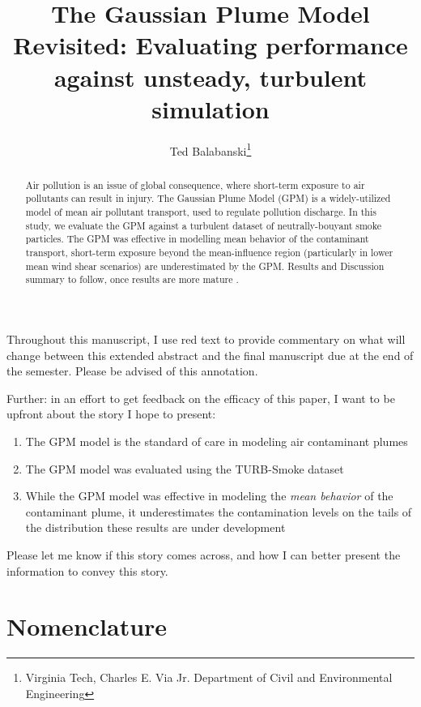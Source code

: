\documentclass[]{aiaa-tc}%
\title{The Gaussian Plume Model Revisited: Evaluating performance against unsteady, turbulent simulation}
\author{ Ted Balabanski\thanks{Virginia Tech, Charles E. Via Jr. Department of Civil and Environmental Engineering} }
\newcommand{\fix}[1]{\color{red} #1 \color{black}}
\begin{document}
\maketitle

\begin{tcolorbox}[colback=blue!4!white,colframe=blue,title=A note to the instructor]
  Throughout this manuscript, I use \fix{red text} to provide commentary on what will change between this extended abstract and the final manuscript due at the end of the semester. Please be advised of this annotation.

  Further: in an effort to get feedback on the efficacy of this paper, I want to be upfront about the story I hope to present:
  \begin{enumerate}
  \item The GPM model is the standard of care in modeling air contaminant plumes
  \item The GPM model was evaluated using the TURB-Smoke dataset
  \item While the GPM model was effective in modeling the \emph{mean behavior} of the contaminant plume, it underestimates the contamination levels on the tails of the distribution \fix{these results are under development}
  \end{enumerate}
  Please let me know if this story comes across, and how I can better present the information to convey this story.
\end{tcolorbox}

\begin{abstract}
  Air pollution is an issue of global consequence, where short-term exposure to air pollutants can result in injury. The Gaussian Plume Model (GPM) is a widely-utilized model of mean air pollutant transport, used to regulate pollution discharge. In this study, we evaluate the GPM against a turbulent dataset of neutrally-bouyant smoke particles. The GPM was effective in modelling mean behavior of the contaminant transport, short-term exposure beyond the mean-influence region (particularly in lower mean wind shear scenarios) are underestimated by the GPM. \fix{Results and Discussion summary to follow, once results are more mature}.
\end{abstract}

\section*{Nomenclature}
\end{document}
